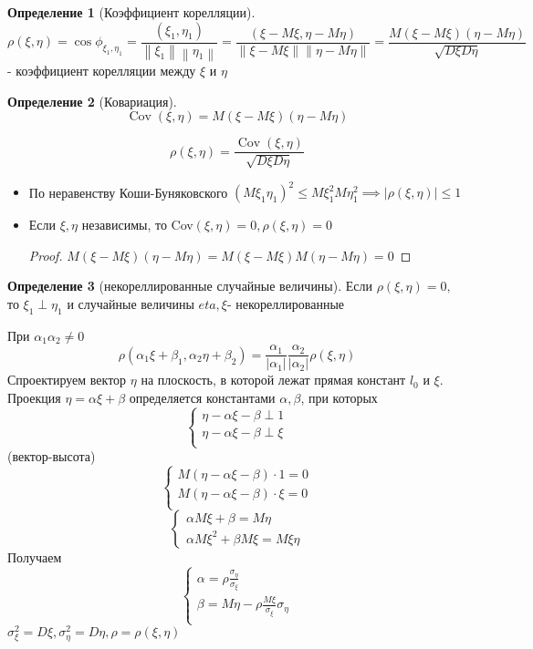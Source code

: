 \documentclass[a4paper]{article}
\theoremstyle{definition}
\newtheorem*{definition}{Определение}
\theoremstyle{remark}
\begin{document}
\begin{enumerate}
    \begin{definition}[Коэффициент корелляции]
        \[\rho(\xi, \eta) = \cos \phi_{\xi_1, \eta_1} = \frac{(\xi_1, \eta_1)}{\left\lVert  \xi_1 \right\rVert \left\lVert \eta_1 \right\rVert } = \frac{(\xi - M\xi, \eta - M\eta)}{\left\lVert \xi - M\xi \right\rVert \left\lVert \eta - M\eta \right\rVert } = \frac{M(\xi - M\xi)(\eta - M\eta)}{\sqrt{D\xi D\eta}}\] - коэффициент корелляции между $\xi$ и $\eta$
    \end{definition}
    \begin{definition}[Ковариация]
        \[\mathop{Cov} (\xi, \eta) = M(\xi - M\xi)(\eta - M\eta)\]
    \end{definition}
    \[\rho(\xi, \eta) = \frac{\mathop{Cov} (\xi, \eta) }{\sqrt{D\xi D\eta}}\]
    \begin{itemize}
        \item По неравенству Коши-Буняковского $(M \xi_1 \eta_1)^2 \le M \xi_1^2 M \eta_1^2\implies |\rho(\xi, \eta)|\le 1$
        \item Если $\xi, \eta$ независимы, то Cov$(\xi, \eta) = 0, \rho(\xi, \eta) = 0$
        \begin{proof}
            $M(\xi - M\xi)(\eta - M\eta) = M(\xi - M\xi)M(\eta - M\eta) = 0$
        \end{proof}
    \end{itemize}
    \begin{definition}[некореллированные случайные величины]
        Если $\rho(\xi, \eta) = 0, $ то $\xi_1 \perp \eta_1$ и случайные величины $eta, \xi$- некореллированные
    \end{definition}
    При $\alpha_1 \alpha_2\neq 0$
    \[\rho(\alpha_1 \xi +\beta_1, \alpha_2 \eta + \beta_2) = \frac{\alpha_1}{|\alpha_1|} \frac{\alpha_2}{|\alpha_2|}\rho(\xi, \eta)\]
    Спроектируем вектор $\eta$ на плоскость, в которой лежат прямая констант $l_0$ и $\xi$. Проекция $\eta = \alpha \xi + \beta$ определяется константами $\alpha, \beta$, при которых 
    \[\begin{cases}
        \eta - \alpha \xi - \beta \perp 1 \\
        \eta - \alpha \xi - \beta \perp \xi \\
    \end{cases}\]
    (вектор-высота)
    \[\begin{cases}
        M(\eta - \alpha \xi - \beta ) \cdot 1  = 0\\
        M(\eta - \alpha \xi - \beta ) \cdot \xi  = 0\\
    \end{cases}\]
    \[\begin{cases}
        \alpha M \xi + \beta = M \eta \\
        \alpha M \xi ^2 + \beta M \xi = M \xi \eta
    \end{cases}\]
    Получаем 
    \[\begin{cases}
        \alpha = \rho \frac{\sigma_\eta}{\sigma_\xi} \\
        \beta = M\eta - \rho \frac{M\xi}{\sigma_\xi}\sigma_\eta \\
    \end{cases}\]
    $\sigma_\xi^2 = D\xi, \sigma_\eta^2 = D\eta, \rho = \rho(\xi, \eta)$
\end{enumerate}
\end{document}
